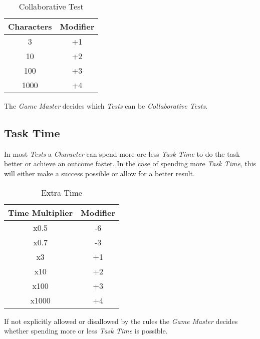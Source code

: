 \begin{table}[htb]
    \caption[CollaborativeTest]{Collaborative Test}
    \label{tab:team-play test}
    \centering
    \begin{tabular}{cc}
        \toprule
        \textbf{Characters} & \textbf{Modifier} \\
        \midrule
        3                   & +1                \\
        10                  & +2                \\
        100                 & +3                \\
        1000                & +4                \\
        \bottomrule
    \end{tabular}
\end{table}

The \emph{Game Master} decides which \emph{Tests} can be \emph{Collaborative Tests}.

\subsection{Task Time}

In most \emph{Tests} a \emph{Character} can spend more ore less \emph{Task Time} to
do the task better or achieve an outcome faster. In the case of spending more
\emph{Task Time}, this will either make a success possible or allow for a better
result.

\begin{table}[htb]
    \caption[Extra Time]{Extra Time}
    \label{tab:extra time}
    \centering
    \begin{tabular}{cc}
        \toprule
        \textbf{Time Multiplier} & \textbf{Modifier} \\
        \midrule
        x0.5                     & -6                \\
        x0.7                     & -3                \\
        x3                       & +1                \\
        x10                      & +2                \\
        x100                     & +3                \\
        x1000                    & +4                \\
        \bottomrule
    \end{tabular}
\end{table}

If not explicitly allowed or disallowed by the rules the \emph{Game Master}
decides whether spending more or less \emph{Task Time} is possible.



